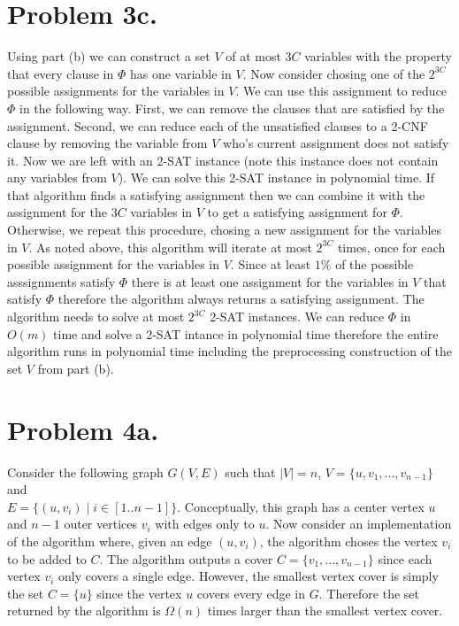 \documentclass[12pt]{article}
\begin{document}
\section*{Problem 3c.}
Using part (b) we can construct a set $V$ of at most $3C$ variables with the
property that every clause in $\Phi$ has one variable in $V$. Now consider
chosing one of the $2^{3C}$ possible assignments for the variables in $V$. We
can use this assignment to reduce $\Phi$ in the following way. First, we can
remove the clauses that are satisfied by the assignment. Second, we can reduce
each of the unsatisfied clauses to a 2-CNF clause by removing the variable from
$V$ who's current assignment does not satisfy it. Now we are left with an 2-SAT
instance (note this instance does not contain any variables from $V$). We can
solve this 2-SAT instance in polynomial time. If that algorithm finds a
satisfying assignment then we can combine it with the assignment for the $3C$
variables in $V$ to get a satisfying assignment for $\Phi$. Otherwise, we repeat
this procedure, chosing a new assignment for the variables in $V$. As noted
above, this algorithm will iterate at most $2^{3C}$ times, once for each
possible assignment for the variables in $V$. Since at least $1\%$ of the
possible asssignments satisfy $\Phi$ there is at least one assignment for the
variables in $V$ that satisfy $\Phi$ therefore the algorithm always returns a
satisfying assignment. The algorithm needs to solve at most $2^{3C}$ 2-SAT
instances. We can reduce $\Phi$ in $O(m)$ time and solve a 2-SAT intance in
polynomial time therefore the entire algorithm runs in polynomial time including
the preprocessing construction of the set $V$ from part (b).

\section*{Problem 4a.}
Consider the following graph $G(V,E)$ such that $|V| = n$,
$V = \{u, v_1, ..., v_{n-1}\}$ and \\
$E = \{(u,v_i) \mid i \in [1..n-1]\}$. Conceptually, this graph has a center
vertex $u$ and $n-1$ outer vertices $v_i$ with edges only to $u$. Now consider
an implementation of the algorithm where, given an edge $(u,v_i)$, the algorithm
choses the vertex $v_i$ to be added to $C$. The algorithm outputs a cover
$C = \{v_1,...,v_{n-1}\}$ since each vertex $v_i$ only covers a single edge.
However, the smallest vertex cover is simply the set $C = \{u\}$ since the
vertex $u$ covers every edge in $G$. Therefore the set returned by the algorithm
is $\Omega(n)$ times larger than the smallest vertex cover.
\end{document}

